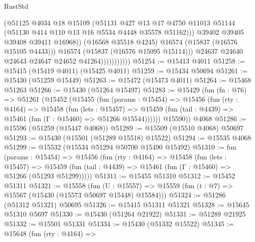 \begin{lexlean}{RustStd}
\begin{coremodule}
                                  (@51125
                                    @4034
                                    @18
                                    @15109
                                    (@51131
                                      @427
                                      @13
                                      @17
                                      @4750
                                      @11013
                                      @51144
                                      (@51130 @414 @110 @13 @16 @5534 @4448 @35578 @51162)))
                                  @39402
                                  @39405
                                  @39408
                                  @39411
                                  @16968))
                              (@16568 @35518 @4245)
                              @16574
                              (@15837 (@16576 @15105 @4433)))
                            @16574
                            (@15837 (@16576 @15095 @15114)))
                          @24637
                          @24640
                          @24643
                          @24647
                          @24652
                          @41264)))))))))))
@51254 := @15413 @4011
@51258 := @15415 (@15419 @4011) (@15425 @4011)
@51259 := @15434 @50694
@51261 := @15430 (@51259 @15449)
@51263 := @15472 (@15473 @4011)
@51264 := @15468 @51263
@51266 := @15430 (@51264 @15497)
@51283 := @15429
    (fun (fn : @76) =>
    @51261
      (@15452
        (@15455
          (fun (params : @15454) =>
          @15456
            (fun (rty : @4164) =>
            @15458
              (fun (lets : @15457) =>
              @15459 (fun (tail : @4439) => @15461 (fun (Γ : @15460) => @51266 @15544))))))
        @15590))
    @4068
@51286 := @15596 (@51259 (@15447 @4068))
@51289 := @15509 (@15510 @4068) @50697
@51293 := @15430 (@15501 (@51289 @15518) @15522)
@51294 := @15535 @4068
@51299 := @15532 (@15534 @51294 @50700 @15490 @15492)
@51310 := fun (params : @15454) =>
  @15456
    (fun (rty : @4164) =>
    @15458
      (fun (lets : @15457) =>
      @15459 (fun (tail : @4439) => @15461 (fun (Γ : @15460) => @51266 (@51293 @51299)))))
@51311 := @15455 @51310
@51312 := @15452 @51311
@51321 := @15558
    (fun (U : @15557) => @15559 (fun (t : @7) => @15567 (@15430 (@15573 @50697 @15448) @15584)))
@51324 := @51286 (@51312 @51321) @50695
@51326 := @15415 @51311 @51321
@51328 := @15645 @51310 @5697
@51330 := @15430 (@51264 @21922)
@51331 := @51289 @21925
@51332 := @15501 @51331
@51334 := @15430 (@51332 @15522)
@51345 := @15648
    (fun (rty : @4164) =>

\end{coremodule}
\end{lexlean}
